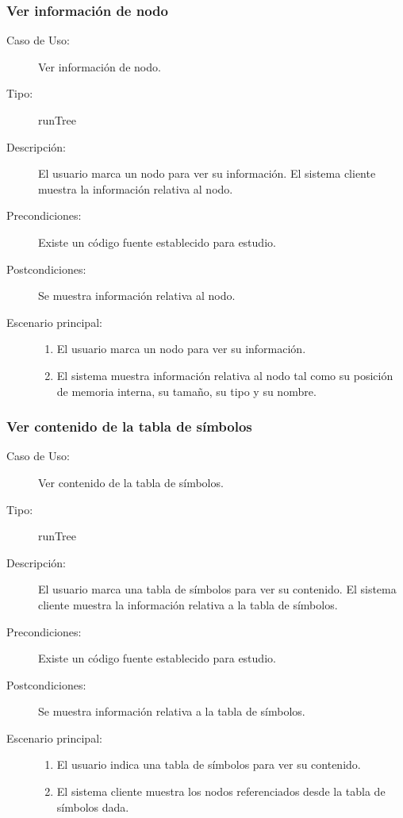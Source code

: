 \subsubsection{Ver información de nodo} 

\begin{description}
   \item[Caso de Uso:] Ver información de nodo.
   \item [Tipo:] runTree
   \item[Descripción:] 
   El usuario marca un nodo para ver su información.  
   El sistema cliente muestra la información relativa al nodo.
   \item[Precondiciones:]
   Existe un código fuente establecido para estudio. 
   \item[Postcondiciones:] 
   Se muestra información relativa al nodo.
   \item[Escenario principal:] \hfill
   \begin{enumerate}
   \item El usuario marca un nodo para ver su información.
   \item El sistema muestra información relativa al nodo tal como su 
   posición de memoria interna, su tamaño, su tipo y su nombre.  
   \end{enumerate}
\end{description}


\subsubsection{Ver contenido de la tabla de símbolos} 

\begin{description}
   \item[Caso de Uso:] Ver contenido de la tabla de símbolos.
   \item [Tipo:] runTree
   \item[Descripción:] 
   El usuario marca una tabla de símbolos para ver su contenido.  
   El sistema cliente muestra la información relativa a la tabla de símbolos.
   \item[Precondiciones:]
   Existe un código fuente establecido para estudio. 
   \item[Postcondiciones:] 
   Se muestra información relativa a la tabla de símbolos.
   \item[Escenario principal:] \hfill
   \begin{enumerate}
   \item El usuario indica una tabla de símbolos para ver su contenido.
   \item El sistema cliente muestra los nodos referenciados desde la tabla de
   símbolos dada.
   \end{enumerate}
\end{description}


